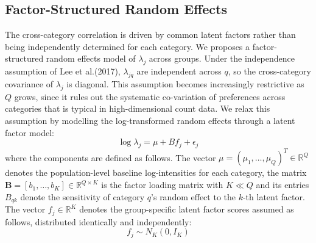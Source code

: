 \documentclass[]{article}
\theoremstyle{definition}
\begin{document}

  
	\subsection{Factor-Structured Random Effects}
	The cross-category correlation is driven by common latent factors rather than being independently determined for each category. We proposes a factor-structured random effects model of $\lambda_{j}$ across groups. Under the independence assumption of Lee et al.(2017), $\lambda_{jq}$ are independent across $q$, so the cross-category covariance of $\lambda_{j}$ is diagonal. This assumption becomes increasingly restrictive as $Q$ grows, since it rules out the systematic co-variation of preferences across categories that is typical in high-dimensional count data. We relax this assumption by modelling the log-transformed random effects through a latent factor model:
	\begin{equation}
		\log \lambda_{j}=\mu+Bf_{j}+\epsilon_{j}
	\end{equation}
	where the components are defined as follows. The vector $\mu=(\mu_{1},\dots ,\mu_{Q})^{T}\in \mathbb{R}^{Q}$ denotes the population-level baseline log-intensities for each category, the matrix $\mathbf{B}=[b_{1},\dots ,b_{K}]\in \mathbb{R}^{Q\times K}$ is the factor loading matrix with $K\ll Q$ and its entries $B_{qk}$ denote the sensitivity of category $q$'s random effect to the $k$-th latent factor. The vector $f_{j}\in \mathbb{R}^{K}$ denotes the group-specific latent factor scores assumed as follows, distributed identically and independently:
	\begin{equation}
		f_{j}\sim N_{K}(0,I_{K})
	\end{equation}
	
\end{document}
